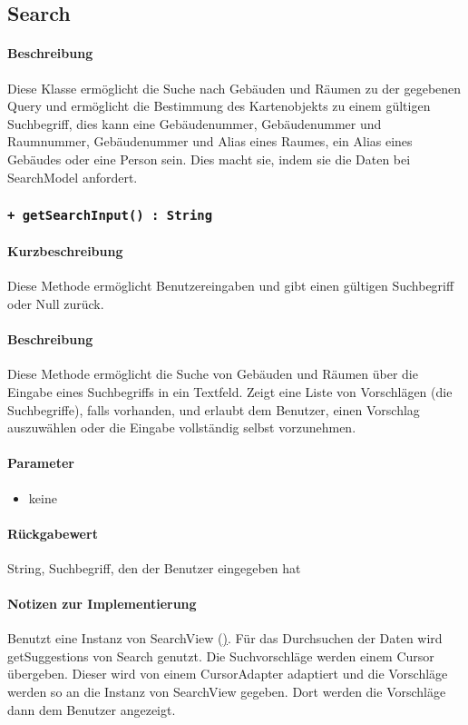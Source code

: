 \subsection{Search}
\paragraph*{Beschreibung}
Diese Klasse ermöglicht die Suche nach Gebäuden und Räumen zu der gegebenen Query 
und ermöglicht die Bestimmung des Kartenobjekts zu einem gültigen Suchbegriff, 
dies kann eine Gebäudenummer, Gebäudenummer und Raumnummer, Gebäudenummer und Alias eines Raumes, ein Alias eines Gebäudes oder eine Person sein.
Dies macht sie, indem sie die Daten bei SearchModel anfordert.

\subsubsection{\texttt{+ getSearchInput() : String}}%
\paragraph*{Kurzbeschreibung}
Diese Methode ermöglicht Benutzereingaben und gibt einen gültigen Suchbegriff oder Null zurück.
\paragraph*{Beschreibung}
Diese Methode ermöglicht die Suche von Gebäuden und Räumen über die Eingabe eines Suchbegriffs in ein Textfeld.
Zeigt eine Liste von Vorschlägen (die Suchbegriffe), falls vorhanden, und erlaubt dem Benutzer, einen Vorschlag auszuwählen oder die Eingabe vollständig selbst vorzunehmen.
\paragraph*{Parameter}
\begin{itemize}
    \item keine
\end{itemize}
\paragraph*{Rückgabewert}
String, Suchbegriff, den der Benutzer eingegeben hat
\paragraph*{Notizen zur Implementierung}
Benutzt eine Instanz von SearchView (\href{https://developer.android.com/guide/topics/search/search-dialog#SearchableActivity}).
Für das Durchsuchen der Daten wird getSuggestions von Search genutzt.
Die Suchvorschläge werden einem Cursor übergeben.
Dieser wird von einem CursorAdapter adaptiert und die Vorschläge werden so an die Instanz von SearchView gegeben.
Dort werden die Vorschläge dann dem Benutzer angezeigt.

